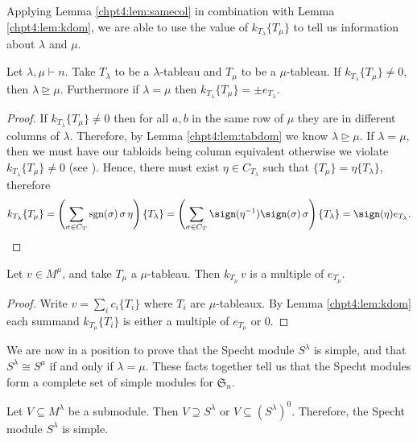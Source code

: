 \documentclass[11pt]{report}
\begin{document}
Applying Lemma \ref{chpt4:lem:samecol} in combination with Lemma \ref{chpt4:lem:kdom}, we are able to use the value of $k_{T_{\lambda}}\{T_{\mu}\}$ to tell us information about $\lambda$ and $\mu$.

\begin{lemma}
	\label{chpt4:lem:kdom}
	Let $\lambda,\mu \vdash n$. Take $T_{\lambda}$ to be a $\lambda$-tableau and $T_{\mu}$ to be a $\mu$-tableau. If $k_{T_{\lambda}} \{T_{\mu}\} \neq 0$, then $\lambda \trianglerighteq \mu$. Furthermore if $\lambda = \mu$ then $k_{T_{\lambda}} \{T_{\mu}\} = \pm e_{T_{\lambda}}$.
\end{lemma}

\begin{proof}
	If $k_{T_{\lambda}} \{T_{\mu}\} \neq 0$ then for all $a,b$ in the same row of $\mu$ they are in different columns of $\lambda$. Therefore, by Lemma \ref{chpt4:lem:tabdom} we know $\lambda \trianglerighteq \mu$. If $\lambda = \mu$, then we must have our tabloids being column equivalent otherwise we violate $k_{T_{\lambda}}\{T_{\mu}\}\neq 0$ (see \cite[Corollary 2.4.2]{sagan2013symmetric}). Hence, there must exist $\eta \in  C_{T_{\lambda}}$ such that $\{T_{\mu}\} = \eta \{T_{\lambda}\}$, therefore
	\[k_{T_{\lambda}} \{T_{\mu}\} = \left( \sum_{\sigma \in C_{T}} \textnormal{sgn}(\sigma) \, \sigma \, \eta \right)  \{T_{\lambda}\} = \left( \sum_{\sigma \in C_{T}} \sign(\eta^{-1})\sign(\sigma) \, \sigma  \right) \{T_{\lambda}\} = \sign(\eta) e_{T_{\lambda}}. \qedhere\]
\end{proof}


\begin{corollary}
	\label{chpt4:cor:kmapmulti}
	Let $v \in M^{\mu}$, and take $T_{\mu}$ a $\mu$-tableau. Then $k_{T_{\mu}} \,v$ is a multiple of $e_{T_{\mu}}$.
\end{corollary}
\begin{proof}
	Write $v = \sum_{i} c_{i} \{T_{i}\}$ where $T_{i}$ are $\mu$-tableaux. By Lemma \ref{chpt4:lem:kdom} each summand $k_{T_{\mu}} \{T_{i}\}$ is either a multiple of $e_{T_{\mu}}$ or $0$.
\end{proof}	

We are now in a position to prove that the Specht module $S^{\lambda}$ is simple, and that $S^{\lambda} \cong S^{\mu}$ if and only if $\lambda = \mu$. These facts together tell us that the Specht modules form a complete set of simple modules for $\mathfrak{S}_{n}$.


\begin{thm}
	\label{chpt4:thm:submodthm}
	Let $V \subseteq M^{\lambda}$ be a submodule. Then $V \supseteq S^{\lambda}$ or $V \subseteq (S^{\lambda})^{0}$. Therefore, the Specht module $S^{\lambda}$ is simple.
\end{thm}
\end{document}

